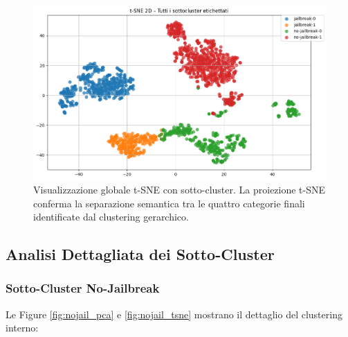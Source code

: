 \documentclass[12pt,a4paper]{article}
\begin{document}
\begin{figure}[H]
    \centering
    \includegraphics[width=\textwidth]{tsnediv.png}
    \caption{Visualizzazione globale t-SNE con sotto-cluster. La proiezione t-SNE conferma la separazione semantica tra le quattro categorie finali identificate dal clustering gerarchico.}
    \label{fig:global_tsne}
\end{figure}

\subsection{Analisi Dettagliata dei Sotto-Cluster}

\subsubsection{Sotto-Cluster No-Jailbreak}

Le Figure \ref{fig:nojail_pca} e \ref{fig:nojail_tsne} mostrano il dettaglio del clustering interno:
\end{document}
